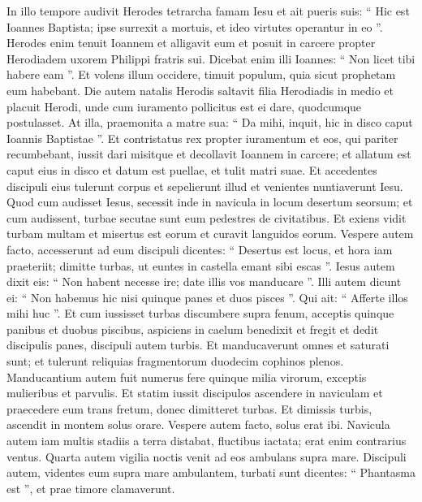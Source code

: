 \begin{biblechapter}
\begin{biblechapter}
\begin{biblechapter}
\begin{biblechapter}
\begin{biblechapter}
\begin{biblechapter}
\begin{biblechapter}
\begin{biblechapter}
\begin{biblechapter}
\begin{biblechapter}
\begin{biblechapter}
\begin{biblechapter}
\begin{biblechapter}
\begin{biblechapter}
\verse In illo tempore audivit Herodes tetrarcha famam Iesu 
\verse et ait pueris suis: “ Hic est Ioannes Baptista; ipse surrexit a mortuis, et ideo virtutes operantur in eo ”. 
\verse Herodes enim tenuit Ioannem et alligavit eum et posuit in carcere propter Herodiadem uxorem Philippi fratris sui. 
\verse Dicebat enim illi Ioannes: “ Non licet tibi habere eam ”. 
\verse Et volens illum occidere, timuit populum, quia sicut prophetam eum habebant.
 \verse Die autem natalis Herodis saltavit filia Herodiadis in medio et placuit Herodi, 
\verse unde cum iuramento pollicitus est ei dare, quodcumque postulasset. 
 \verse At illa, praemonita a matre sua: “ Da mihi, inquit, hic in disco caput Ioannis Baptistae ”. 
\verse Et contristatus rex propter iuramentum et eos, qui pariter recumbebant, iussit dari 
\verse misitque et decollavit Ioannem in carcere; 
 \verse et allatum est caput eius in disco et datum est puellae, et tulit matri suae. 
 \verse Et accedentes discipuli eius tulerunt corpus et sepelierunt illud et venientes nuntiaverunt Iesu.
 \verse Quod cum audisset Iesus, secessit inde in navicula in locum desertum seorsum; et cum audissent, turbae secutae sunt eum pedestres de civitatibus. 
\verse Et exiens vidit turbam multam et misertus est eorum et curavit languidos eorum. 
 \verse Vespere autem facto, accesserunt ad eum discipuli dicentes: “ Desertus est locus, et hora iam praeteriit; dimitte turbas, ut euntes in castella emant sibi escas ”. 
\verse Iesus autem dixit eis: “ Non habent necesse ire; date illis vos manducare ”. 
\verse Illi autem dicunt ei: “ Non habemus hic nisi quinque panes et duos pisces ”. 
\verse Qui ait: “ Afferte illos mihi huc ”. 
\verse Et cum iussisset turbas discumbere supra fenum, acceptis quinque panibus et duobus piscibus, aspiciens in caelum benedixit et fregit et dedit discipulis panes, discipuli autem turbis. 
\verse Et manducaverunt omnes et saturati sunt; et tulerunt reliquias fragmentorum duodecim cophinos plenos. 
\verse Manducantium autem fuit numerus fere quinque milia virorum, exceptis mulieribus et parvulis.
 \verse Et statim iussit discipulos ascendere in naviculam et praecedere eum trans fretum, donec dimitteret turbas. 
\verse Et dimissis turbis, ascendit in montem solus orare. Vespere autem facto, solus erat ibi.
 \verse Navicula autem iam multis stadiis a terra distabat, fluctibus iactata; erat enim contrarius ventus. 
\verse Quarta autem vigilia noctis venit ad eos ambulans supra mare. 
\verse Discipuli autem, videntes eum supra mare ambulantem, turbati sunt dicentes: “ Phantasma est ”, et prae timore clamaverunt. 

\end{biblechapter}
\end{biblechapter}
\end{biblechapter}
\end{biblechapter}
\end{biblechapter}
\end{biblechapter}
\end{biblechapter}
\end{biblechapter}
\end{biblechapter}
\end{biblechapter}
\end{biblechapter}
\end{biblechapter}
\end{biblechapter}
\end{biblechapter}
